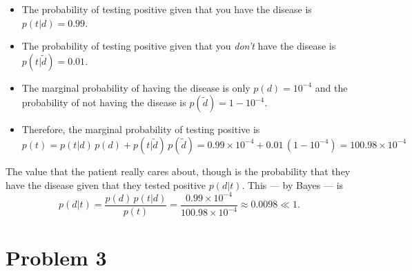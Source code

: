 \documentclass[11pt]{article}
\newcommand{\pr}[1]{\ensuremath{p(#1)}}
\newcommand{\no}[1]{\ensuremath{\tilde{#1}}}
\begin{document}
\begin{itemize}

    \item{The probability of testing positive given that you have the disease
        is $\pr{t|d} = 0.99$.}
    \item{The probability of testing positive given that you \emph{don't}
        have the disease is $\pr{t|\no{d}} = 0.01$.}
    \item{The marginal probability of having the disease is only
        $\pr{d} = 10^{-4}$ and the probability of not having the disease
        is $\pr{\no{d}} = 1-10^{-4}$.}
    \item{Therefore, the marginal probability of testing positive is
        \begin{equation}
            \pr{t} = \pr{t|d} \, \pr{d} + \pr{t|\no{d}} \, \pr{\no{d}}
                   = 0.99 \times 10^{-4} + 0.01 \, (1-10^{-4})
                   = 100.98 \times 10^{-4}
        \end{equation}
    }

\end{itemize}

\noindent The value that the patient really cares about, though is the
probability that they have the disease given that they tested positive
\pr{d | t}. This --- by Bayes --- is
\begin{equation}
    \pr{d | t} = \frac{\pr{d} \, \pr{t | d}}{\pr{t}}
               = \frac{0.99 \times 10^{-4}}{100.98 \times 10^{-4}}
               \approx 0.0098 \ll 1.
\end{equation}

\section{Problem 3}
\end{document}
